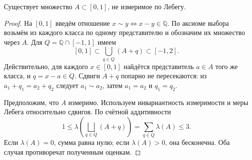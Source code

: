 \label{ticket:23}

\begin{theorem}
Существует множество $A\subset[0,1]$, не измеримое по Лебегу.
\end{theorem}

\begin{proof}
На $[0,1]$ введём отношение $x\sim y\iff x-y\in\mathbb Q$.
По аксиоме выбора возьмём из каждого класса по одному представителю и обозначим их множество через $A$.
Для $Q=\mathbb Q\cap[-1,1]$ имеем
\[
  [0,1]\subset\bigcup_{q\in Q}(A+q)\subset[-1,2].
\]
Действительно, для каждого $x\in[0,1]$ найдётся представитель $a\in A$ того же класса, и $q=x-a\in Q$.
Сдвиги $A+q$ попарно не пересекаются: из $a_1+q_1=a_2+q_2$ следует $a_1\sim a_2$, затем $a_1=a_2$ и $q_1=q_2$.

Предположим, что $A$ измеримо.
Используем инвариантность измеримости и меры Лебега относительно сдвигов.
По счётной аддитивности
\[
  1\le\lambda\left(\bigsqcup_{q\in Q}(A+q)\right)
    =\sum_{q\in Q}\lambda(A)\le3.
\]
Если $\lambda(A)=0$, сумма равна нулю; если $\lambda(A)>0$, она бесконечна.
Оба случая противоречат полученным оценкам.
\end{proof}
